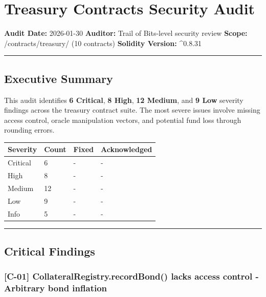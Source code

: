 \documentclass[
]{article}
\author{}
\date{}
\newcounter{none} %
\begin{document}
\section{Treasury Contracts Security
Audit}\label{treasury-contracts-security-audit}

\textbf{Audit Date:} 2026-01-30 \textbf{Auditor:} Trail of Bits-level
security review \textbf{Scope:} /contracts/treasury/ (10 contracts)
\textbf{Solidity Version:} \^{}0.8.31

\begin{center}\rule{0.5\linewidth}{0.5pt}\end{center}

\subsection{Executive Summary}\label{executive-summary}

This audit identifies \textbf{6 Critical}, \textbf{8 High}, \textbf{12
Medium}, and \textbf{9 Low} severity findings across the treasury
contract suite. The most severe issues involve missing access control,
oracle manipulation vectors, and potential fund loss through rounding
errors.

{\def\LTcaptype{none} %
\begin{longtable}[]{@{}llll@{}}
\toprule\noalign{}
Severity & Count & Fixed & Acknowledged \\
\midrule\noalign{}
\endhead
\bottomrule\noalign{}
\endlastfoot
Critical & 6 & - & - \\
High & 8 & - & - \\
Medium & 12 & - & - \\
Low & 9 & - & - \\
Info & 5 & - & - \\
\end{longtable}
}

\begin{center}\rule{0.5\linewidth}{0.5pt}\end{center}

\subsection{Critical Findings}\label{critical-findings}

\subsubsection{{[}C-01{]} CollateralRegistry.recordBond() lacks access
control - Arbitrary bond
inflation}\label{c-01-collateralregistryrecordbond-lacks-access-control---arbitrary-bond-inflation}
\end{document}
